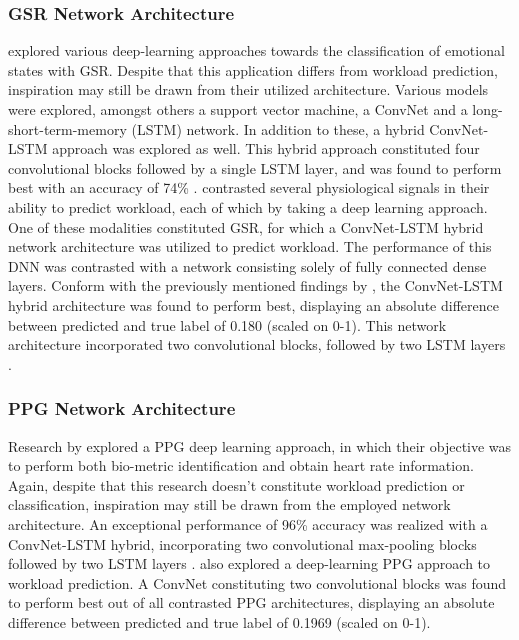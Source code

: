 \documentclass[fleqn,11pt]{paper}
\begin{document}
\subsubsection*{GSR Network Architecture}
 explored various deep-learning approaches towards the classification of emotional states with GSR. Despite that this application differs from workload prediction, inspiration may still be drawn from their utilized architecture. Various models were explored, amongst others a support vector machine, a ConvNet and a long-short-term-memory (LSTM) network. In addition to these, a hybrid ConvNet-LSTM approach was explored as well. This hybrid approach constituted four convolutional blocks followed by a single LSTM layer, and was found to perform best with an accuracy of 74\% \cite{sun2019hybrid}.  contrasted several physiological signals in their ability to predict workload, each of which by taking a deep learning approach. One of these modalities constituted GSR, for which a ConvNet-LSTM hybrid network architecture was utilized to predict workload. The performance of this DNN was contrasted with a network consisting solely of fully connected dense layers. Conform with the previously mentioned findings by  , the ConvNet-LSTM hybrid architecture was found to perform best, displaying an absolute difference between predicted and true label of 0.180 (scaled on 0-1). This network architecture incorporated two convolutional blocks, followed by two LSTM layers \cite{dolmans2020perceived}.

\subsubsection*{PPG Network Architecture}
Research by  explored a PPG deep learning approach, in which their objective was to perform both bio-metric identification and obtain heart rate information. Again, despite that this research doesn't constitute workload prediction or classification, inspiration may still be drawn from the employed network architecture. An exceptional performance of 96\% accuracy was realized with a ConvNet-LSTM hybrid, incorporating two convolutional max-pooling blocks followed by two LSTM layers \cite{biswas2019cornet}.  also explored a deep-learning PPG approach to workload prediction.  A ConvNet constituting two convolutional blocks was found to perform best out of all contrasted PPG architectures, displaying an absolute difference between predicted and true label of 0.1969 (scaled on 0-1).
\end{document}
